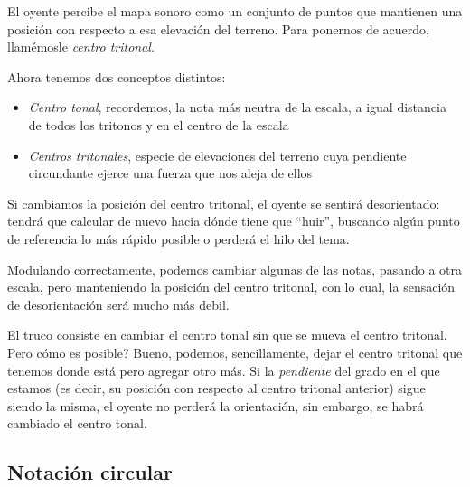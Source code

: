 \documentclass[]{report}
\providecommand{\tightlist}{%
  \setlength{\itemsep}{0pt}
  \setlength{\parskip}{0pt}
}
\begin{document}
El oyente percibe el mapa sonoro como un conjunto de puntos que mantienen una posición con respecto a esa elevación del terreno. Para ponernos de acuerdo, llamémosle \emph{centro tritonal}.

Ahora tenemos dos conceptos distintos:
\begin{itemize}   \tightlist
	\item \emph{Centro tonal}, recordemos, la nota más neutra de la escala, a igual distancia de todos los tritonos y en el centro de la escala
	\item \emph{Centros tritonales}, especie de elevaciones del terreno cuya pendiente circundante ejerce una fuerza que nos aleja de ellos
\end{itemize}


Si cambiamos la posición del centro tritonal, el oyente se sentirá desorientado: tendrá que calcular de nuevo hacia dónde tiene que ``huir'', buscando algún punto de referencia lo más rápido posible o perderá el hilo del tema.

Modulando correctamente, podemos cambiar algunas de las notas, pasando a otra escala, pero manteniendo la posición del centro tritonal, con lo cual, la sensación de desorientación será mucho más debil.

El truco consiste en cambiar el centro tonal sin que se mueva el centro tritonal. Pero cómo es posible? Bueno, podemos, sencillamente, dejar el centro tritonal que tenemos donde está pero agregar otro más. Si la \emph{pendiente} del grado en el que estamos (es decir, su posición con respecto al centro tritonal anterior) sigue siendo la misma, el oyente no perderá la orientación, sin embargo, se habrá cambiado el centro tonal.

\subsection{Notación circular}
\end{document}
